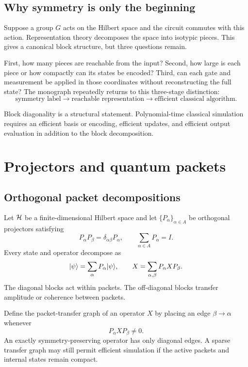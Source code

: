 \subsection{Why symmetry is only the beginning}
Suppose a group $G$ acts on the Hilbert space and the circuit commutes with this action. Representation theory decomposes the space into isotypic pieces. This gives a canonical block structure, but three questions remain.

First, how many pieces are reachable from the input? Second, how large is each piece or how compactly can its states be encoded? Third, can each gate and measurement be applied in those coordinates without reconstructing the full state? The monograph repeatedly returns to this three-stage distinction:
\[
\text{symmetry label}
\longrightarrow
\text{reachable representation}
\longrightarrow
\text{efficient classical algorithm}.
\]

\begin{principle}
Block diagonality is a structural statement. Polynomial-time classical simulation requires an efficient basis or encoding, efficient updates, and efficient output evaluation in addition to the block decomposition.
\end{principle}

\section{Projectors and quantum packets}
\label{s:ch:projectors}

\subsection{Orthogonal packet decompositions}
Let $\mathcal H$ be a finite-dimensional Hilbert space and let $\{P_\alpha\}_{\alpha\in A}$ be orthogonal projectors satisfying
\[
P_\alpha P_\beta=\delta_{\alpha\beta}P_\alpha,
\qquad
\sum_{\alpha\in A}P_\alpha=I.
\]
Every state and operator decompose as
\[
\lvert \psi\rangle=\sum_\alpha P_\alpha\lvert \psi\rangle,
\qquad
X=\sum_{\alpha,\beta}P_\alpha X P_\beta.
\]
The diagonal blocks act within packets. The off-diagonal blocks transfer amplitude or coherence between packets.

Define the packet-transfer graph of an operator $X$ by placing an edge $\beta\to\alpha$ whenever
\[
P_\alpha X P_\beta\neq0.
\]
An exactly symmetry-preserving operator has only diagonal edges. A sparse transfer graph may still permit efficient simulation if the active packets and internal states remain compact.

